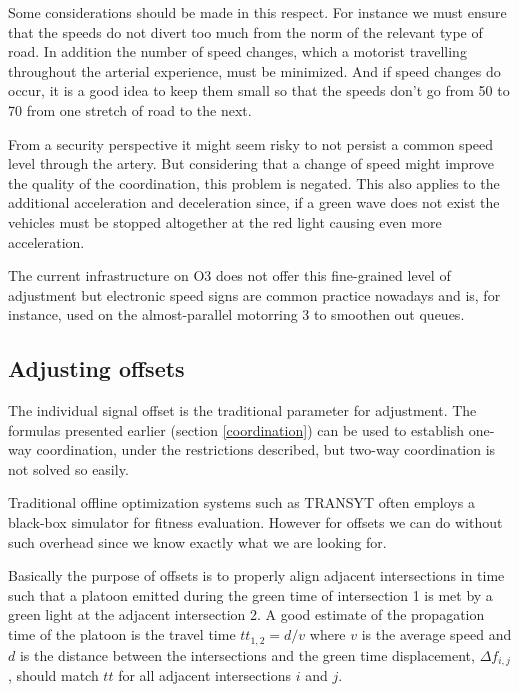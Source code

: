 Some considerations should be made in this respect. For instance we must ensure that the speeds do not divert too much from the norm of the relevant type of road. In addition the number of speed changes, which a motorist travelling throughout the arterial experience, must be minimized. And if speed changes do occur, it is a good idea to keep them small so that the speeds don't go from 50 to 70 from one stretch of road to the next.

From a security perspective it might seem risky to not persist a common speed level through the artery. But considering that a change of speed might improve the quality of the coordination, this problem is negated. This also applies to the additional acceleration and deceleration since, if a green wave does not exist the vehicles must be stopped altogether at the red light causing even more acceleration.

The current infrastructure on O3 does not offer this fine-grained level of adjustment but electronic speed signs are common practice nowadays and is, for instance, used on the almost-parallel motorring 3 to smoothen out queues.

\subsection{Adjusting offsets}
The individual signal offset is the traditional parameter for adjustment. The formulas presented earlier (section \ref{coordination}) can be used to establish one-way coordination, under the restrictions described, but two-way coordination is not solved so easily.

Traditional offline optimization systems such as TRANSYT often employs a black-box simulator for fitness evaluation. However for offsets we can do without such overhead since we know exactly what we are looking for.

Basically the purpose of offsets is to properly align adjacent intersections in time such that a platoon emitted during the green time of intersection 1 is met by a green light at the adjacent intersection 2. A good estimate of the propagation time of the platoon is the travel time $tt_{1,2} = d / v$ where $v$ is the average speed and $d$ is the distance between the intersections and the green time displacement, $\Delta f_{i,j}$, should match $tt$ for all adjacent intersections $i$ and $j$.

